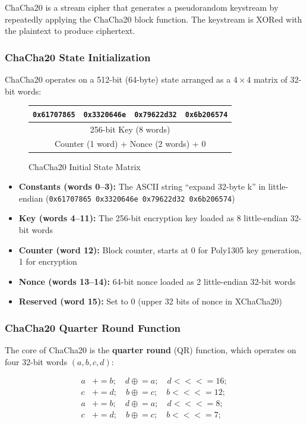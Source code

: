 \documentclass[11pt,a4paper]{article}
\begin{document}
ChaCha20 is a stream cipher that generates a pseudorandom keystream by repeatedly applying the ChaCha20 block function. The keystream is XORed with the plaintext to produce ciphertext.

\subsubsection{ChaCha20 State Initialization}

ChaCha20 operates on a 512-bit (64-byte) state arranged as a $4\times4$ matrix of 32-bit words:

\begin{figure}[H]
\centering
\begin{tabular}{|c|c|c|c|}
\hline
\texttt{0x61707865} & \texttt{0x3320646e} & \texttt{0x79622d32} & \texttt{0x6b206574} \\
\hline
\multicolumn{4}{|c|}{256-bit Key (8 words)} \\
\hline
\multicolumn{4}{|c|}{Counter (1 word) + Nonce (2 words) + 0} \\
\hline
\end{tabular}
\caption{ChaCha20 Initial State Matrix}
\end{figure}

\begin{itemize}[noitemsep]
    \item \textbf{Constants (words 0--3):} The ASCII string ``expand 32-byte k'' in little-endian (\texttt{0x61707865 0x3320646e 0x79622d32 0x6b206574})
    \item \textbf{Key (words 4--11):} The 256-bit encryption key loaded as 8 little-endian 32-bit words
    \item \textbf{Counter (word 12):} Block counter, starts at 0 for Poly1305 key generation, 1 for encryption
    \item \textbf{Nonce (words 13--14):} 64-bit nonce loaded as 2 little-endian 32-bit words
    \item \textbf{Reserved (word 15):} Set to 0 (upper 32 bits of nonce in XChaCha20)
\end{itemize}

\subsubsection{ChaCha20 Quarter Round Function}

The core of ChaCha20 is the \textbf{quarter round} (QR) function, which operates on four 32-bit words $(a, b, c, d)$:

\begin{align*}
a &\mathrel{+}= b; \quad d \mathrel{\oplus}= a; \quad d \mathrel{<<<}= 16; \\
c &\mathrel{+}= d; \quad b \mathrel{\oplus}= c; \quad b \mathrel{<<<}= 12; \\
a &\mathrel{+}= b; \quad d \mathrel{\oplus}= a; \quad d \mathrel{<<<}= 8; \\
c &\mathrel{+}= d; \quad b \mathrel{\oplus}= c; \quad b \mathrel{<<<}= 7;
\end{align*}
\end{document}
